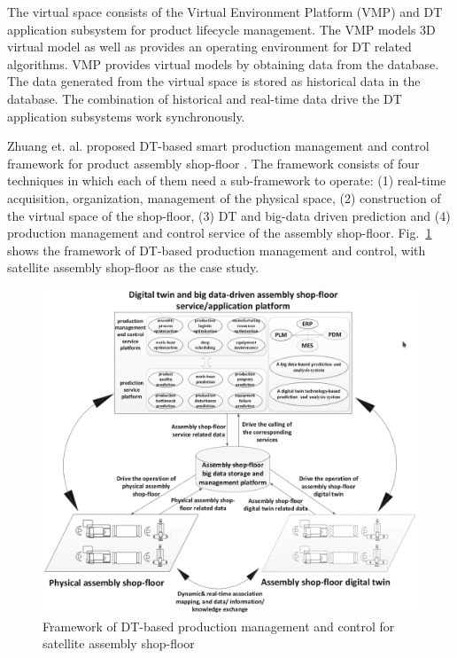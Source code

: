 \documentclass[article]{aaltoseries}
\begin{document}
The virtual space consists of the Virtual Environment Platform (VMP) and DT application subsystem for product lifecycle management. The VMP models 3D virtual model as well as provides an operating environment for DT related algorithms. VMP provides virtual models by obtaining data from the database. The data generated from the virtual space is stored as historical data in the database. The combination of historical and real-time data drive the DT application subsystems work synchronously.

Zhuang et. al. proposed DT-based smart production management and control framework for product assembly shop-floor \cite{Zhuang2018}. The framework consists of four techniques in which each of them need a sub-framework to operate: (1) real-time acquisition, organization, management of the physical space, (2) construction of the virtual space of the shop-floor, (3) DT and big-data driven prediction and (4) production management and control service of the assembly shop-floor. Fig.~\ref{fig:zhuang_framework} shows the framework of DT-based production management and control, with satellite assembly shop-floor as the case study.

\begin{figure}[t!]
	\begin{center}
		\includegraphics[width=1\textwidth]{figures/zhuang_dt_framework}
		\caption{Framework of DT-based production management and control for satellite assembly shop-floor \cite{Zhuang2018}}
		\label{fig:zhuang_framework}
	\end{center}
\end{figure}
\end{document}
